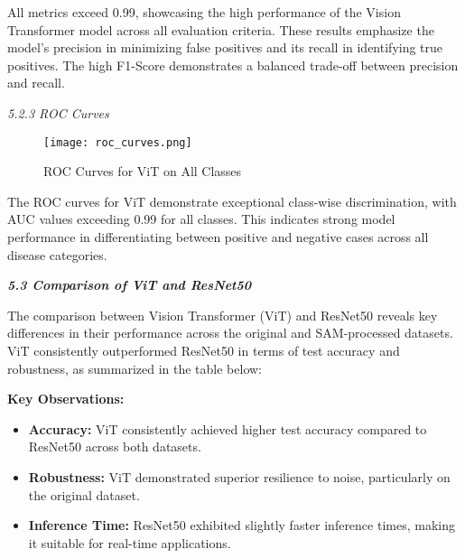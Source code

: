 \documentclass{article}
\begin{document}
All metrics exceed 0.99, showcasing the high performance of the Vision Transformer model across all evaluation criteria. These results emphasize the model’s precision in minimizing false positives and its recall in identifying true positives. The high F1-Score demonstrates a balanced trade-off between precision and recall.

\textit{5.2.3 ROC Curves}


\begin{figure}[H]
    \centering
    \texttt{[image: roc\_curves.png]} %
    \captionsetup{font=small}
    \caption{ROC Curves for ViT on All Classes}
\end{figure}

The ROC curves for ViT demonstrate exceptional class-wise discrimination, with AUC values exceeding 0.99 for all classes. This indicates strong model performance in differentiating between positive and negative cases across all disease categories.

\textbf{\textit{5.3 Comparison of ViT and ResNet50}}

The comparison between Vision Transformer (ViT) and ResNet50 reveals key differences in their performance across the original and SAM-processed datasets. ViT consistently outperformed ResNet50 in terms of test accuracy and robustness, as summarized in the table below:

\begin{table}[h!]
\centering
{}
\captionsetup{font=small}
\caption{Comparison of ViT and ResNet50 Across Original and SAM-Processed Datasets}
\label{tab:model_comparison_resized}
\end{table}


\textbf{Key Observations:}
\begin{itemize}
    \item \textbf{Accuracy:} ViT consistently achieved higher test accuracy compared to ResNet50 across both datasets.
    \item \textbf{Robustness:} ViT demonstrated superior resilience to noise, particularly on the original dataset.
    \item \textbf{Inference Time:} ResNet50 exhibited slightly faster inference times, making it suitable for real-time applications.
\end{itemize}
\end{document}
